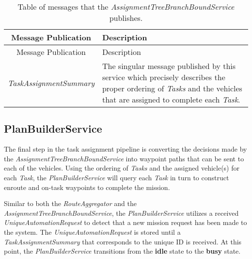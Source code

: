 \begin{longtable}[]{@{}cl@{}}
\caption{Table of messages that the
\emph{AssignmentTreeBranchBoundService} publishes.}\tabularnewline
\toprule
\begin{minipage}[b]{0.40\columnwidth}\centering\strut
Message Publication\strut
\end{minipage} & \begin{minipage}[b]{0.55\columnwidth}\raggedright\strut
Description\strut
\end{minipage}\tabularnewline
\midrule
\endfirsthead
\toprule
\begin{minipage}[b]{0.40\columnwidth}\centering\strut
Message Publication\strut
\end{minipage} & \begin{minipage}[b]{0.55\columnwidth}\raggedright\strut
Description\strut
\end{minipage}\tabularnewline
\midrule
\endhead
\begin{minipage}[t]{0.40\columnwidth}\centering\strut
\emph{TaskAssignmentSummary}\strut
\end{minipage} & \begin{minipage}[t]{0.55\columnwidth}\raggedright\strut
The singular message published by this service which precisely describes
the proper ordering of \emph{Tasks} and the vehicles that are assigned
to complete each \emph{Task}.\strut
\end{minipage}\tabularnewline
\bottomrule
\end{longtable}

\subsection{PlanBuilderService}\label{planbuilderservice}

The final step in the task assignment pipeline is converting the
decisions made by the \emph{AssignmentTreeBranchBoundService} into
waypoint paths that can be sent to each of the vehicles. Using the
ordering of \emph{Tasks} and the assigned vehicle(s) for each
\emph{Task}, the \emph{PlanBuilderService} will query each \emph{Task}
in turn to construct enroute and on-task waypoints to complete the
mission.

Similar to both the \emph{RouteAggregator} and the
\emph{AssignmentTreeBranchBoundService}, the \emph{PlanBuilderService}
utilizes a received \emph{UniqueAutomationRequest} to detect that a new
mission request has been made to the system. The
\emph{UniqueAutomationRequest} is stored until a
\emph{TaskAssignmentSummary} that corresponds to the unique ID is
received. At this point, the \emph{PlanBuilderService} transitions from
the \textbf{idle} state to the \textbf{busy} state.

